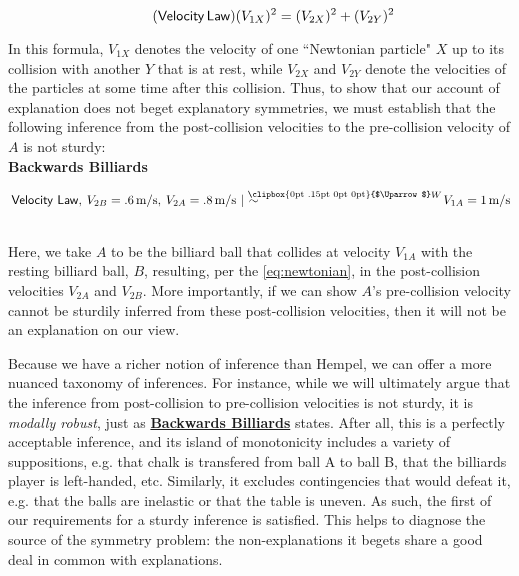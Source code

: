\documentclass{article}                     %
\makeatletter
\newcommand{\Uuparrow}{%
	\raisebox{.2ex}{\clipbox{0pt .15pt 0pt 0pt}{$\Uparrow$}}
}
\newcommand{\nms}{%
	\mathbin{\mathpalette\@nms\expandafter}
}
\newcommand{\@nms}{\mid\joinrel\mkern-.5mu\sim}
\newcommand{\mrc}[1]{\mathbin{
		\mathchoice
		{\normalsize\hspace{.5mm}\nms^{\mkern-19mu\scriptsize\Uuparrow#1}\hspace{-.5mm}}
		{\normalsize\hspace{.5mm}\nms^{\mkern-19mu\scriptsize\Uuparrow#1}\hspace{-.5mm}}
		{\footnotesize\hspace{.5mm}\nms^{\mkern-13.5mu\fontsize{5.5}{0}\Uuparrow#1}}
		{\scriptsize\nms^{\mkern-10mu\tiny\Uuparrow#1}}
	}
}
\makeatother
\begin{document}
\begin{equation} 
	\label{eq:newtonian}
	\tag{$ \mathsf{Velocity\,Law} $}
	(V_{1X})^{2} = (V_{2X})^{2} + (V_{2Y})^{2}
\end{equation} 

In this formula, $V_{1X}$ denotes the velocity of one ``Newtonian particle" $X$ up to its collision with another $Y$ that is at rest, while $V_{2X}$ and $V_{2Y}$ denote the velocities of the particles at some time after this collision. Thus, to show that our account of explanation does not beget explanatory symmetries, we must establish that the following inference from the post-collision velocities to the pre-collision velocity of $A$ is not sturdy:\\

\noindent \label{eq:MRC_ballsbackwards}\textbf{Backwards Billiards}\hspace{8mm}\begin{minipage}[t]{.8\textwidth}
	$\hspace{.5ex} \mathsf{Velocity\ Law},\hspace{.5ex} V_{2B} = .6\,\text{m/s},\hspace{.5ex} V_{2A} = .8\,\text{m/s} \mrc{W} V_{1A} = 1\,\text{m/s}$
\end{minipage}\\ 

\noindent Here, we take $A$ to be the billiard ball that collides at velocity $V_{1A}$ with the resting billiard ball, $B$, resulting, per the \ref{eq:newtonian}, in the post-collision velocities $V_{2A}$ and $V_{2B}$. More importantly, if we can show $A$'s pre-collision velocity cannot be sturdily inferred from these post-collision velocities, then it will not be an explanation on our view.

Because we have a richer notion of inference than Hempel, we can offer a more nuanced taxonomy of inferences. For instance, while we will ultimately argue that the inference from post-collision to pre-collision velocities is not sturdy, it is \textit{modally robust}, just as \hyperref[eq:MRC_ballsbackwards]{\textbf{Backwards Billiards}} states. After all, this is a perfectly acceptable inference, and its island of monotonicity includes a variety of suppositions, e.g. that chalk is transfered from ball A to ball B, that the billiards player is left-handed, etc. Similarly, it excludes contingencies that would defeat it, e.g. that the balls are inelastic or that the table is uneven. As such, the first of our requirements for a sturdy inference is satisfied. This helps to diagnose the source of the symmetry problem: the non-explanations it begets share a good deal in common with explanations.
\end{document}
